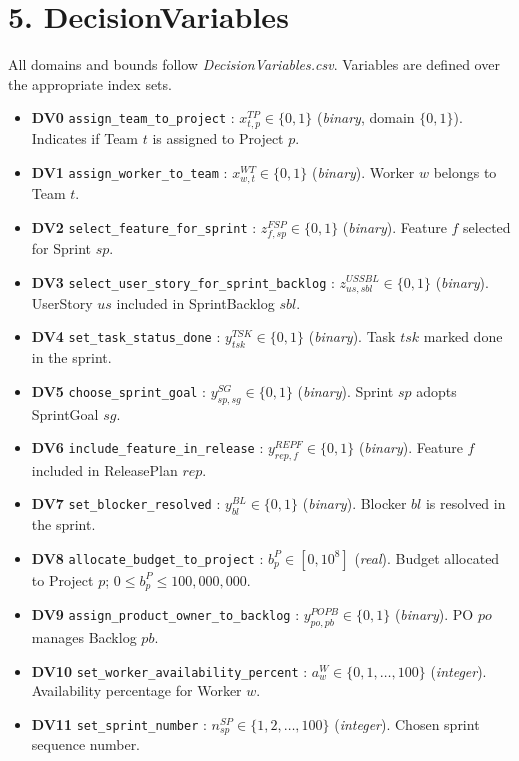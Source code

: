 \documentclass[11pt,a4paper]{article}
\begin{document}
\section{5. DecisionVariables}
All domains and bounds follow \emph{DecisionVariables.csv}. Variables are defined over the appropriate index sets.

\begin{itemize}[leftmargin=2.2em]
  \item \textbf{DV0} \texttt{assign\_team\_to\_project} : $x^{TP}_{t,p}\in\{0,1\}$ (\emph{binary}, domain $\{0,1\}$). Indicates if Team $t$ is assigned to Project $p$.
  \item \textbf{DV1} \texttt{assign\_worker\_to\_team} : $x^{WT}_{w,t}\in\{0,1\}$ (\emph{binary}). Worker $w$ belongs to Team $t$.
  \item \textbf{DV2} \texttt{select\_feature\_for\_sprint} : $z^{FSP}_{f,sp}\in\{0,1\}$ (\emph{binary}). Feature $f$ selected for Sprint $sp$.
  \item \textbf{DV3} \texttt{select\_user\_story\_for\_sprint\_backlog} : $z^{US SBL}_{us,sbl}\in\{0,1\}$ (\emph{binary}). UserStory $us$ included in SprintBacklog $sbl$.
  \item \textbf{DV4} \texttt{set\_task\_status\_done} : $y^{TSK}_{tsk}\in\{0,1\}$ (\emph{binary}). Task $tsk$ marked done in the sprint.
  \item \textbf{DV5} \texttt{choose\_sprint\_goal} : $y^{SG}_{sp,sg}\in\{0,1\}$ (\emph{binary}). Sprint $sp$ adopts SprintGoal $sg$.
  \item \textbf{DV6} \texttt{include\_feature\_in\_release} : $y^{REP F}_{rep,f}\in\{0,1\}$ (\emph{binary}). Feature $f$ included in ReleasePlan $rep$.
  \item \textbf{DV7} \texttt{set\_blocker\_resolved} : $y^{BL}_{bl}\in\{0,1\}$ (\emph{binary}). Blocker $bl$ is resolved in the sprint.
  \item \textbf{DV8} \texttt{allocate\_budget\_to\_project} : $b^{P}_{p}\in[0,10^8]$ (\emph{real}). Budget allocated to Project $p$; $0\le b^{P}_{p}\le 100{,}000{,}000$.
  \item \textbf{DV9} \texttt{assign\_product\_owner\_to\_backlog} : $y^{PO PB}_{po,pb}\in\{0,1\}$ (\emph{binary}). PO $po$ manages Backlog $pb$.
  \item \textbf{DV10} \texttt{set\_worker\_availability\_percent} : $a^{W}_{w}\in\{0,1,\dots,100\}$ (\emph{integer}). Availability percentage for Worker $w$.
  \item \textbf{DV11} \texttt{set\_sprint\_number} : $n^{SP}_{sp}\in\{1,2,\dots,100\}$ (\emph{integer}). Chosen sprint sequence number.
\end{itemize}
\end{document}

